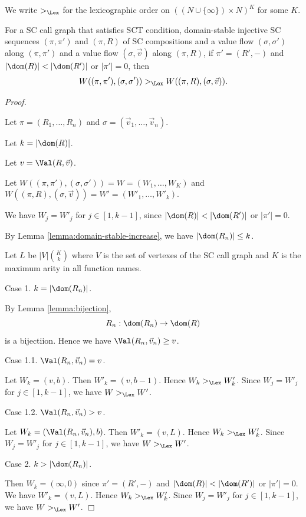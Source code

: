 \begin{Def}\rm
We write $>_\Lex$ for the lexicographic order on $((N\cup\{\infty\}) \times N)^K$
for some $K$.
\end{Def}

\begin{Lemma}\label{lemma:stable-extension}
For a SC call graph that satisfies SCT condition,
domain-stable injective SC sequences $(\pi,\pi')$ and $(\pi,R)$ of SC compositions and 
a value flow $(\sigma,\sigma')$ along $(\pi,\pi')$ and
a value flow $(\sigma,\Vec v)$ along $(\pi,R)$,
if $\pi'=(R',-)$ and $|\dom(R)|<|\dom(R')|$ or $|\pi'|=0$,
then
\[
W((\pi,\pi'),(\sigma,\sigma'))
>_\Lex
W((\pi,R),(\sigma,\Vec v)).
\]
\end{Lemma}

{\em Proof.}

Let $\pi=(R_1,\ldots,R_n)$ and $\sigma = (\Vec v_1,\ldots,\Vec v_n)$.

Let $k=|\dom(R)|$.

Let $v = \Val(R,\Vec v)$.

Let $W((\pi,\pi'),(\sigma,\sigma')) = W = (W_1,\ldots,W_K)$ and
$W((\pi,R),(\sigma,\Vec v)) = W' = (W'_1,\ldots,W'_k)$.

We have $W_j = W'_j$ for $j \in [1,k-1]$, since $|\dom(R)|<|\dom(R')|$
or $|\pi'|=0$.

By Lemma \ref{lemma:domain-stable-increase}, 
we have $|\dom(R_{n})| \le k$.

Let $L$ be $|V|{K \choose k}$ 
where $V$ is the set of vertexes of the SC call graph
and $K$ is the maximum arity in all function names.

Case 1. $k=|\dom(R_{n})|$.

By Lemma \ref{lemma:bijection},
\[
R_n:\dom(R_n) \to \dom(R)
\]
is a bijectiion.
Hence we have $\Val(R_n,\Vec {v}_{n}) \ge v$.

Case 1.1. $\Val(R_n,\Vec {v}_{n}) = v$.

Let $W_k = (v,b)$.
Then $W'_k = (v, b-1)$.
Hence $W_k >_\Lex W'_k$.
Since $W_j = W'_j$ for $j \in [1,k-1]$,
we have $W >_\Lex W'$.

Case 1.2. $\Val(R_{n},\Vec {v}_{n}) > v$.

Let $W_k = (\Val(R_{n},\Vec {v}_{n}),b)$.
Then $W'_k = (v, L)$.
Hence $W_k >_\Lex W'_k$.
Since $W_j = W'_j$ for $j \in [1,k-1]$,
we have $W >_\Lex W'$.

Case 2. $k>|\dom(R_{n})|$.

Then $W_k = (\infty,0)$ since 
$\pi'=(R',-)$ and $|\dom(R)|<|\dom(R')|$ or $|\pi'|=0$.
We have $W'_k = (v, L)$.
Hence $W_k >_\Lex W'_k$.
Since $W_j = W'_j$ for $j \in [1,k-1]$,
we have $W >_\Lex W'$.
$\Box$

